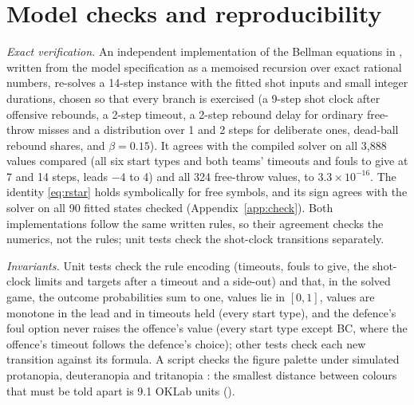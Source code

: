 \documentclass[article]{jdssv}
\newcommand{\BC}{\textsf{BC}}
\begin{document}
\section{Model checks and reproducibility} \label{sec:checks}

\emph{Exact verification.} An independent implementation of the Bellman equations in
, written from the model specification as a memoised recursion over exact rational
numbers, re-solves a 14-step instance with the fitted shot inputs and small integer durations, chosen so that
every branch is exercised (a 9-step shot clock after offensive rebounds, a 2-step timeout, a 2-step rebound delay
for ordinary free-throw misses and a distribution over 1 and 2 steps for deliberate ones, dead-ball rebound shares, and
$\beta=0.15$). It agrees with the compiled solver on all 3{,}888 values compared (all six start types and both teams'
timeouts and fouls to give at 7 and 14 steps, leads $-4$ to 4) and all 324 free-throw values, to $3.3\times10^{-16}$. The identity \eqref{eq:rstar} holds symbolically for
free symbols, and its sign agrees with the solver on all 90 fitted states checked (Appendix~\ref{app:check}).
Both implementations follow the same written rules, so their agreement checks the numerics, not the rules; unit
tests check the shot-clock transitions separately.

\emph{Invariants.} Unit tests check the rule encoding (timeouts, fouls to give, the shot-clock limits and
targets after a timeout and a side-out) and that, in the solved game, the outcome
probabilities sum to one, values lie in $[0,1]$, values are monotone in the lead and in timeouts held (every start
type), and the defence's foul option never raises the offence's value (every start type except \BC, where the
offence's timeout follows the defence's choice); other tests check each new transition against its formula. A script checks the figure palette under simulated
protanopia, deuteranopia and tritanopia \citep{Machado2009}: the smallest distance between
colours that must be told apart is 9.1 OKLab units ().
\end{document}
